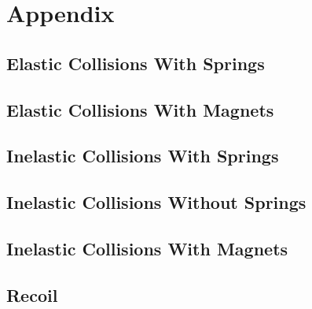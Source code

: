 \documentclass[12pt]{article}
\begin{document}
\section{Appendix}
\subsection{Elastic Collisions With Springs}


\subsection{Elastic Collisions With Magnets}


\subsection{Inelastic Collisions With Springs}


\subsection{Inelastic Collisions Without Springs}


\subsection{Inelastic Collisions With Magnets}


\subsection{Recoil}

\end{document}
